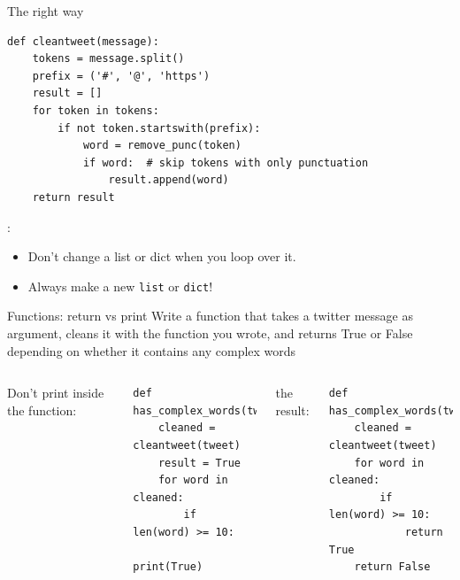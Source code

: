 \documentclass[aspectratio=169,usenames,dvipsnames]{beamer}
\begin{document}
\begin{frame}[fragile]{The right way}
\begin{lstlisting}[style=smaller]
def cleantweet(message):
    tokens = message.split()
    prefix = ('#', '@', 'https')
    result = []
    for token in tokens:
        if not token.startswith(prefix):
            word = remove_punc(token)
            if word:  # skip tokens with only punctuation
                result.append(word)
    return result
\end{lstlisting}
:
\begin{itemize}
    \item Don't change a list or dict when you loop over it.
    \item Always make a new \lstinline{list} or \lstinline{dict}!
\end{itemize}
\end{frame}


\begin{frame}[fragile]{Functions: return vs print}
Write a function that takes a twitter message as argument, cleans it with the
function you wrote, and returns True or False depending on whether it
contains any complex words
\begin{columns}
Don't print inside the function:
\begin{lstlisting}[style=smaller]
def has_complex_words(tweet):
    cleaned = cleantweet(tweet)
    result = True
    for word in cleaned:
        if len(word) >= 10:
            print(True)
\end{lstlisting}
\pause{}
 the result: 
\begin{lstlisting}[style=smaller]
def has_complex_words(tweet):
    cleaned = cleantweet(tweet)
    for word in cleaned:
        if len(word) >= 10:
            return True
    return False
\end{lstlisting}
\end{columns}
\end{frame}
\end{document}
